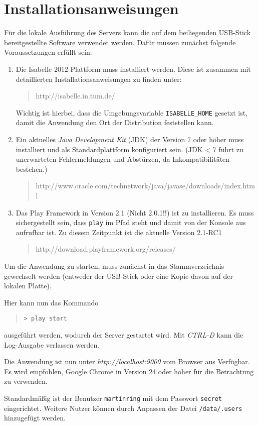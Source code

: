 \chapter{Installationsanweisungen}
\label{sec:install}

Für die lokale Ausführung des Servers kann die auf dem beiliegenden USB-Stick bereitgestellte
Software verwendet werden. Dafür müssen zunächst folgende Voraussetzungen erfüllt sein:

\begin{enumerate}
  \item Die Isabelle 2012 Plattform muss installiert werden. Diese ist zusammen mit detaillierten 
  Installationsanweisungen zu finden unter:
  \begin{quote}
  http://isabelle.in.tum.de/
  \end{quote}
  Wichtig ist hierbei, dass die Umgebungsvariable \texttt{ISABELLE\_HOME} gesetzt ist, damit die 
  Anwendung den Ort der Distribution feststellen kann.
  \item Ein aktuelles \textit{Java Development Kit} (JDK) der Version 7 oder höher muss installiert und als 
  Standardplattform konfiguriert sein. (JDK < 7 führt zu unerwarteten Fehlermeldungen und Abstürzen, 
  da Inkompatibilitäten bestehen.)
  \begin{quote}
  http://www.oracle.com/technetwork/java/javase/downloads/index.html
  \end{quote}
  \item Das Play Framework in Version 2.1 (Nicht 2.0.1!!) ist zu installieren. Es muss 
  sichergestellt sein, dass \texttt{play} im Pfad steht und damit von der Konsole aus aufrufbar ist. 
  Zu diesem Zeitpunkt ist die aktuelle Version 2.1-RC1
  \begin{quote}
  http://download.playframework.org/releases/
  \end{quote}
\end{enumerate}

Um die Anwendung zu starten, muss zunächst in das Stammverzeichnis gewechselt werden (entweder der
USB-Stick oder eine Kopie davon auf der lokalen Platte).

Hier kann nun das Kommando

\begin{quote}
\texttt{> play start}
\end{quote}

ausgeführt werden, wodurch der Server gestartet wird. Mit \textit{CTRL-D} kann die Log-Ausgabe
verlassen werden.

Die Anwendung ist nun unter \textit{http://localhost:9000} vom Browser aus Verfügbar. Es wird
empfohlen, Google Chrome in Version 24 oder höher für die Betrachtung zu verwenden.

Standardmäßig ist der Benutzer \texttt{martinring} mit dem Passwort \texttt{secret} eingerichtet.
Weitere Nutzer können durch Anpassen der Datei \texttt{/data/.users} hinzugefügt werden.